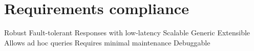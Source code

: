 \section{Requirements compliance}

Robust
Fault-tolerant
Responses with low-latency
Scalable
Generic
Extensible
Allows ad hoc queries
Requires minimal maintenance
Debuggable